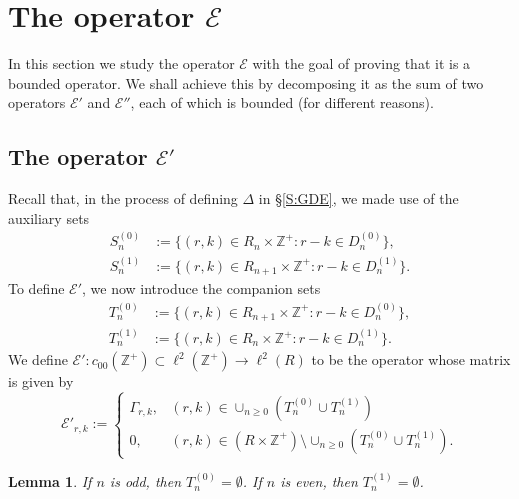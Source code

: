 \documentclass[11pt,reqno]{amsart}
\theoremstyle{plain}
\newtheorem{lemma}[theorem]{Lemma}
\theoremstyle{definition}
\theoremstyle{remark}
\newcommand{\cE}{\mathcal{E}}
\newcommand{\ZZ}{\mathbb{Z}}
\begin{document}

\section{The operator $\cE$}

In this section we study the operator $\cE$ with the goal
of proving that it is a bounded operator.
We shall achieve this by decomposing it as the sum
of two operators $\cE'$ and $\cE''$, each of which is bounded
(for different reasons).

\subsection{The operator $\cE'$}
Recall that,
in the process of defining $\Delta$  in \S\ref{S:GDE},
we made use of the auxiliary sets 
\begin{align*}
S_n^{(0)}&:=\{(r,k)\in  R_n\times \ZZ^+: r-k\in D_n^{(0)}\},\\
S_n^{(1)}&:=\{(r,k)\in  R_{n+1}\times \ZZ^+: r-k\in D_n^{(1)}\}.
\end{align*}
To define $\cE'$, we now introduce the companion sets
\begin{align*}
T_n^{(0)}&:=\{(r,k)\in  R_{n+1}\times \ZZ^+: r-k\in D_n^{(0)}\},\\
T_n^{(1)}&:=\{(r,k)\in  R_{n}\times \ZZ^+: r-k\in D_n^{(1)}\}.
\end{align*}
We define
$\cE':c_{00}(\ZZ^+)\subset\ell^2(\ZZ^+)\to\ell^2(R)$ 
to be the operator whose matrix is given by
\[
\cE'_{r,k}:=
\begin{cases}
\Gamma_{r,k}, &(r,k)\in \cup_{n\ge0}(T_n^{(0)}\cup T_n^{(1)})\\
0, &(r,k)\in (R\times\ZZ^+)\setminus \cup_{n\ge0}(T_n^{(0)}\cup T_n^{(1)}).
\end{cases}
\]

\begin{lemma}\label{L:empty}
If $n$ is odd, then $T_n^{(0)}=\emptyset$.
If $n$ is even, then $T_n^{(1)}=\emptyset$.
\end{lemma}
\end{document}
